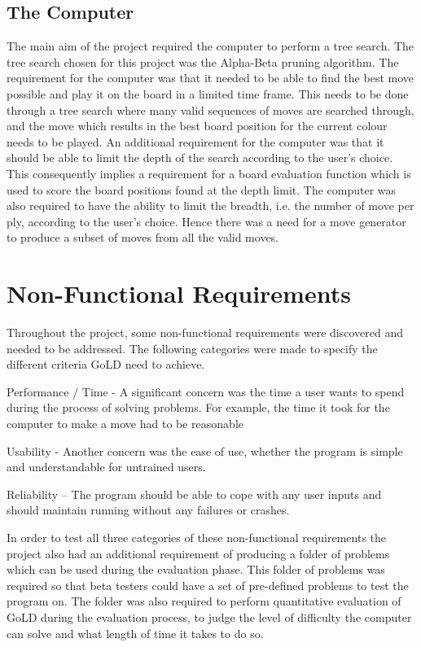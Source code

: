 \documentclass{l4proj}
\begin{document}
\subsection{The Computer}
The main aim of the project required the computer to perform a tree search. The tree search chosen for this project was the Alpha-Beta pruning algorithm. The requirement for the computer was that it needed to be able to find the best move possible and play it on the board in a limited time frame. This needs to be done through a tree search where many valid sequences of moves are searched through, and the move which results in the best board position for the current colour needs to be played. An additional requirement for the computer was that it should be able to limit the depth of the search according to the user’s choice. This consequently implies a requirement for a board evaluation function which is used to score the board positions found at the depth limit. The computer was also required to have the ability to limit the breadth, i.e. the number of move per ply, according to the user’s choice. Hence there was a need for a move generator to produce a subset of moves from all the valid moves.


\section{Non-Functional Requirements}
Throughout the project, some non-functional requirements were discovered and needed to be addressed. The following categories were made to specify the different criteria GoLD need to achieve.

Performance / Time - A significant concern was the time a user wants to spend during the process of solving problems. For example, the time it took for the computer to make a move had to be reasonable

Usability - Another concern was the ease of use, whether the program is simple and understandable for untrained users.

Reliability – The program should be able to cope with any user inputs and should maintain running without any failures or crashes.

In order to test all three categories of these non-functional requirements the project also had an additional requirement of producing a folder of problems which can be used during the evaluation phase. This folder of problems was required so that beta testers could have a set of pre-defined problems to test the program on. The folder was also required to perform quantitative evaluation of GoLD during the evaluation process, to judge the level of difficulty the computer can solve and what length of time it takes to do so.
\end{document}
